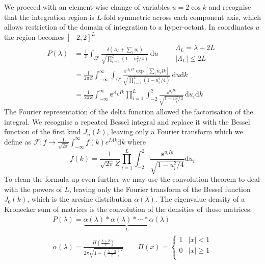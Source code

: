 We proceed with an element-wise change of variables $u=2\cos k$ and recognise that the integration region is $L$-fold symmetric across each component axis, which allows restriction of the domain of integration to a hyper-octant. In coordinates $u$ the region becomes $[-2,2]^L$
\begin{align*}
  P(\lambda)&=\frac{1}{Z}
  \int_{\Omega'}\!
  \frac{\delta(\Lambda_L+\sum_{i}u_i)}
  {\sqrt{\prod_{i=1}^L(1-u_i^2/4) }}
  \,\mathrm{d}u
  \qquad
  \begin{matrix}
    \Lambda_L=\lambda+2L \\
    |\Lambda_L|\leq2L
  \end{matrix}\\
  &=\frac{1}{2\pi Z}
  \int_{-\infty}^{\infty}\int_{\Omega'}\!
  \frac{\mathbb{e}^{\Lambda_L Ik}\exp[\sum_{i}u_i Ik]}
  {\sqrt{\prod_{i=1}^L(1-u_i^2/4) }}
  \,\mathrm{d}u\mathrm{d}k\\
  &=\frac{1}{2\pi Z}
  \int_{-\infty}^{\infty}\mathbb{e}^{\Lambda_L Ik}
  \prod_{i=1}^L\int_{-2}^{2}\!
  \frac{\mathbb{e}^{u_i Ik}}
  {\sqrt{1-u_i^2/4}}
  \,\mathrm{d}u_i\mathrm{d}k
\end{align*}
The Fourier representation of the delta function allowed the
factorisation of the integral. We recognise a repeated Bessel integral and replace it with the Bessel function of the first kind $J_n(k)$, leaving only a Fourier transform which we define as $\mathcal{F} : f\rightarrow \frac{1}{\sqrt{2\pi}} \int_{-\infty}^{\infty}f(k)e^{ I\Lambda k}\mathrm{d}k$
where
\begin{equation*}
    f(k) = \frac{1}{\sqrt{2\pi}Z}\prod_{i=1}^L\int_{-2}^{2}\!
  \frac{\mathbb{e}^{u_i Ik}}
  {\sqrt{1-u_i^2/4}} \mathrm{d}u_i
\end{equation*}
To clean the formula up even further we may use the convolution theorem to deal with the powers of $L$, leaving only the Fourier transform of the Bessel function $J_0(k)$, which is the arcsine distribution $\alpha(\lambda)$. The eigenvalue density of a Kronecker sum of matrices is the convolution of the densities of those matrices.
\begin{align}
  P(\lambda)=\underbrace{
  \alpha(\lambda)*\alpha(\lambda)*\cdots*\alpha(\lambda)}_{L}\qquad\qquad\label{eq:mlap}\\
    \alpha(\lambda)=
      \frac{\Pi\left(\frac{\lambda+2}{2}\right)}{2\pi\sqrt{1-\left(\frac{\lambda+2}{2}\right)^2}}
    \qquad
    \Pi(x)=
      \begin{cases}
        1 & |x|<1\\
        0 & |x|\geq1\\
      \end{cases}
	\label{eq:laplacian-distribution}
\end{align}

